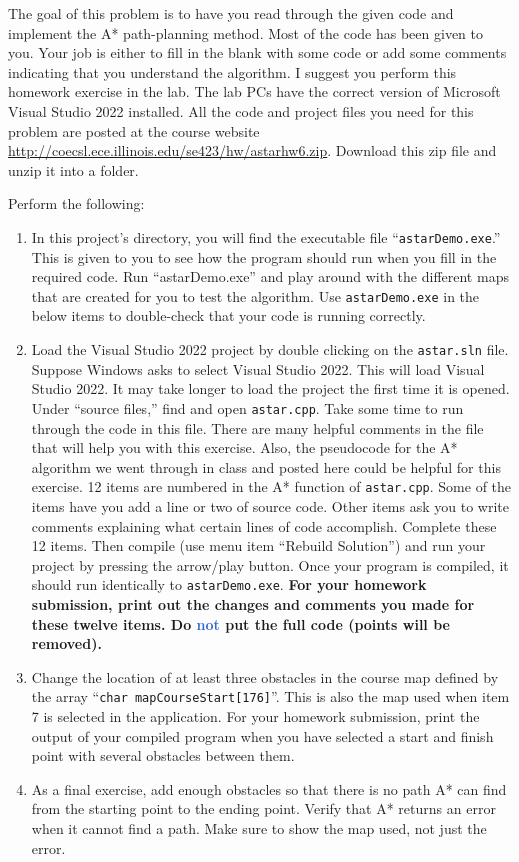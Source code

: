 \documentclass[11pt]{article}
\begin{document}
\MakeAssignmentTitle


The goal of this problem is to have you read through the given code and implement the A* path-planning method. Most of the code has been given to you. Your job is either to fill in the blank with some code or add some comments indicating that you understand the algorithm. I suggest you perform this homework exercise in the lab. The lab PCs have the correct version of Microsoft Visual Studio 2022 installed. All the code and project files you need for this problem are posted at the course website \url{http://coecsl.ece.illinois.edu/se423/hw/astarhw6.zip}. Download this zip file and unzip it into a folder.

Perform the following:
%
\begin{enumerate}
        \item In this project’s directory, you will find the executable file “\verb|astarDemo.exe|.”  This is given to you to see how the program should run when you fill in the required code. Run “astarDemo.exe” and play around with the different maps that are created for you to test the algorithm. Use \verb|astarDemo.exe| in the below items to double-check that your code is running correctly.
        \item Load the Visual Studio 2022 project by double clicking on the \verb|astar.sln| file. Suppose Windows asks to select Visual Studio 2022. This will load Visual Studio 2022. It may take longer to load the project the first time it is opened. Under “source files,” find and open \verb|astar.cpp|. Take some time to run through the code in this file. There are many helpful comments in the file that will help you with this exercise. Also, the pseudocode for the A* algorithm we went through in class and posted here could be helpful for this exercise. 12 items are numbered in the A* function of \verb|astar.cpp|. Some of the items have you add a line or two of source code. Other items ask you to write comments explaining what certain lines of code accomplish. Complete these 12 items. Then compile (use menu item “Rebuild Solution”) and run your project by pressing the arrow/play button. Once your program is compiled, it should run identically to \verb|astarDemo.exe|. \textbf{For your homework submission, print out the changes and comments you made for these twelve items. Do \textcolor{highlight}{not} put the full code (points will be removed).}
        \item Change the location of at least three obstacles in the course map defined by the array “\texttt{char mapCourseStart[176]}”. This is also the map used when item 7 is selected in the application. For your homework submission, print the output of your compiled program when you have selected a start and finish point with several obstacles between them.
    \item As a final exercise, add enough obstacles so that there is no path A* can find from the starting point to the ending point. Verify that A* returns an error when it cannot find a path. Make sure to show the map used, not just the error.
\end{enumerate}
%
\end{document}
